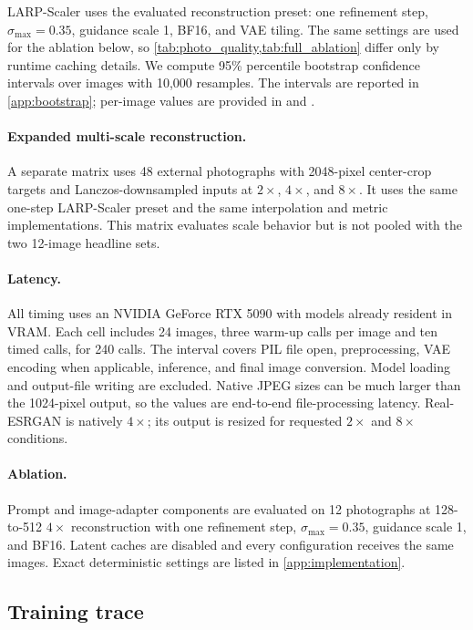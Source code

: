 \documentclass[10pt]{article}
\newcommand{\method}{LARP-Scaler\xspace}
\begin{document}
\method uses the evaluated reconstruction preset: one refinement step,
$\sigma_{\max}=0.35$, guidance scale 1, BF16, and VAE tiling. The
same settings are used for the ablation below, so
\cref{tab:photo_quality,tab:full_ablation} differ only by runtime caching
details. We compute 95\% percentile bootstrap confidence intervals over images
with 10,000 resamples. The intervals are reported in \cref{app:bootstrap};
per-image values are provided in
 and
.

\paragraph{Expanded multi-scale reconstruction.}
A separate matrix uses 48 external photographs with 2048-pixel center-crop
targets and Lanczos-downsampled inputs at $2\times$, $4\times$, and $8\times$.
It uses the same one-step \method preset and the same interpolation and metric
implementations. This matrix evaluates scale behavior but is not pooled with
the two 12-image headline sets.

\paragraph{Latency.}
All timing uses an NVIDIA GeForce RTX 5090 with models already resident in
VRAM. Each cell includes 24 images, three warm-up calls per image and ten timed
calls, for 240 calls. The interval covers PIL file open, preprocessing, VAE
encoding when applicable, inference, and final image conversion. Model loading
and output-file writing are excluded. Native JPEG sizes can be much larger than
the 1024-pixel output, so the values are end-to-end file-processing latency.
Real-ESRGAN is natively $4\times$; its output is resized for requested
$2\times$ and $8\times$ conditions.

\paragraph{Ablation.}
Prompt and image-adapter components are evaluated on 12 photographs at
128-to-512 $4\times$ reconstruction with one refinement step,
$\sigma_{\max}=0.35$, guidance scale 1, and BF16. Latent caches are disabled
and every configuration receives the same images. Exact deterministic settings
are listed in \cref{app:implementation}.

\subsection{Training trace}
\end{document}
